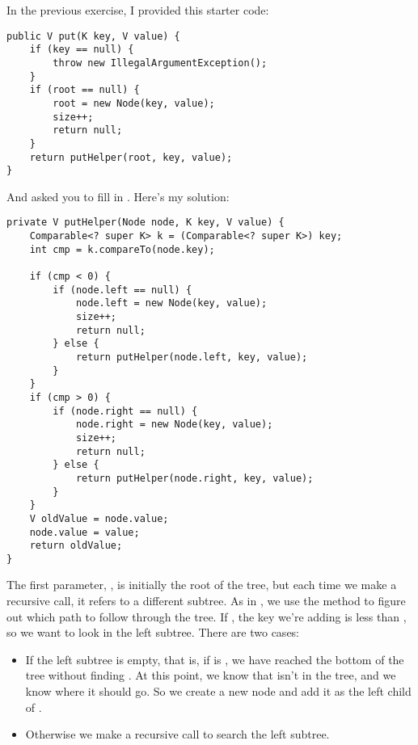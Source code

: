 \documentclass[12pt]{book}
\theoremstyle{exercise}
\begin{document}
In the previous exercise, I provided this starter code:

\begin{verbatim}
public V put(K key, V value) {
    if (key == null) {
        throw new IllegalArgumentException();
    }
    if (root == null) {
        root = new Node(key, value);
        size++;
        return null;
    }
    return putHelper(root, key, value);
}
\end{verbatim}

And asked you to fill in . Here's my solution:

\begin{verbatim}
private V putHelper(Node node, K key, V value) {
    Comparable<? super K> k = (Comparable<? super K>) key;
    int cmp = k.compareTo(node.key);

    if (cmp < 0) {
        if (node.left == null) {
            node.left = new Node(key, value);
            size++;
            return null;
        } else {
            return putHelper(node.left, key, value);
        }
    }
    if (cmp > 0) {
        if (node.right == null) {
            node.right = new Node(key, value);
            size++;
            return null;
        } else {
            return putHelper(node.right, key, value);
        }
    }
    V oldValue = node.value;
    node.value = value;
    return oldValue;
}
\end{verbatim}


The first parameter, , is initially the root of the tree,
but each time we make a recursive call, it refers to a different
subtree.  As in , we use the  method to
figure out which path to follow through the tree.  If ,
the key we're adding is less than , so we want to look
in the left subtree. There are two cases:

\begin{itemize}

\item
  If the left subtree is empty, that is, if  is
  , we have reached the bottom of the tree without finding
  . At this point, we know that  isn't in the
  tree, and we know where it should go. So we create a new node and add
  it as the left child of .

\item
  Otherwise we make a recursive call to search the left subtree.

\end{itemize}
\end{document}

